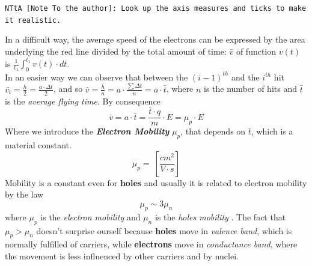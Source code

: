 \documentclass[12pt]{article}
\newcommand{\B}{\textbf}
\newcommand{\I}{\textit}
\begin{document}
 \verb|NTtA [Note To the author]: Look up the axis measures and ticks to make it realistic. |
\begin{center}
\end{center}
In a difficult way, the average speed of the electrons can be expressed by the area underlying the red line divided by the total amount of time: $\bar{v}$ of function $v(t)$ is $\frac{1}{t_1}\int_{0}^{t_1} v(t) \cdot dt$.\\
In an easier way we can observe that between the $(i-1)^{th}$  and the $i^{th}$ hit $\bar{v_i} = \frac{h}{2} = \frac{a\cdot \Delta t}{2}$, and so $\bar{v} = \frac{\bar{h}}{n}= a \cdot \frac{\sum\Delta t}{n} = a \cdot \bar{t}$, where $n$ is the number of hits and $\bar{t}$ is the \I{average flying time}. 
By consequence
\begin{equation}
\bar{v} = a \cdot \bar{t} = \frac{\bar{t} \cdot q}{m}\cdot E = \mu_p \cdot E
\end{equation}  
Where we introduce the  \B{\I{Electron Mobility}} $\mu_p$, that depends on $\bar{t}$, which is a material constant.
\begin{equation}
\mu_p = \ [\frac{cm^2}{V \cdot s}]
\end{equation}  
Mobility is a constant even for \B{holes} and usually it is related to electron mobility by the law
\begin{equation}
\mu_p \sim 3\mu_n
\end{equation}
where $\mu_p$ is the \I{electron mobility} and $\mu_n$ is the \I{holes mobility} . 
The fact that $\mu_p > \mu_n$ doesn't surprise ourself because \B{holes} move in \I{valence band}, which is normally fulfilled of carriers, while \B{electrons} move in \I{conductance band}, where the movement is less influenced by other carriers and by nuclei.  
\end{document}
